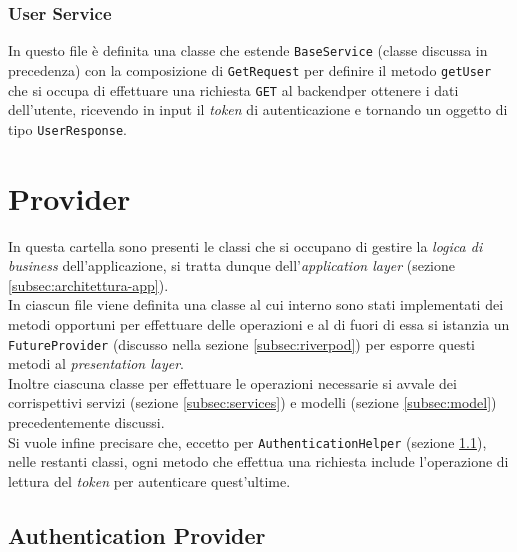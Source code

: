 \subsubsection*{User Service}
\label{subsubsec:user-service}

In questo file è definita una classe che estende \lstinline{BaseService} (classe discussa in precedenza) con la composizione di \lstinline{GetRequest} per definire il metodo \lstinline{getUser} che si occupa di effettuare una richiesta \lstinline{GET} al \gls{backend}\glsoccur per ottenere i dati dell'utente, ricevendo in input il \emph{token} di autenticazione e tornando un oggetto di tipo \lstinline{UserResponse}.

\section{Provider}
\label{sec:provider}

In questa cartella sono presenti le classi che si occupano di gestire la \emph{logica di business} dell'applicazione, si tratta dunque dell'\emph{application layer} (sezione \ref{subsec:architettura-app}).\\
In ciascun file viene definita una classe al cui interno sono stati implementati dei metodi opportuni per effettuare delle operazioni e al di fuori di essa si istanzia un \lstinline{FutureProvider}\cite{site:future-provider} (discusso nella sezione \ref{subsec:riverpod}) per esporre questi metodi al \emph{presentation layer}.\\
Inoltre ciascuna classe per effettuare le operazioni necessarie si avvale dei corrispettivi servizi (sezione \ref{subsec:services}) e modelli (sezione \ref{subsec:model}) precedentemente discussi. \\
Si vuole infine precisare che, eccetto per \lstinline{AuthenticationHelper} (sezione \ref{subsec:authentication-provider}), nelle restanti classi, ogni metodo che effettua una richiesta include l'operazione di lettura del \emph{token} per autenticare quest'ultime.

\subsection{Authentication Provider}
\label{subsec:authentication-provider}

